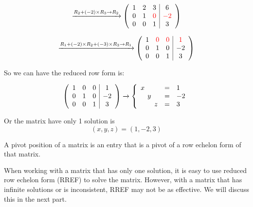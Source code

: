 \documentclass[a4paper,12pt]{article}
\begin{document}
\begin{frame}
        \[
        \xrightarrow{R_2 + (-2)\times R_3 \rightarrow R_2}
        \left( \begin{array}{ccc|c}
        1 & 2 & 3 & 6 \\
        0 & 1 & \textcolor{red}{0} & \textcolor{red}{-2} \\
        0 & 0 & 1 & 3 \\
        \end{array} \right)
        \]
        
\[
\xrightarrow{R_1 + (-2) \times R_2 + (-3) \times R_3 \rightarrow R_1}
\left( \begin{array}{ccc|c}
1 & \textcolor{red}{0} & \textcolor{red}{0} & \textcolor{red}{1} \\
0 & 1 & 0 & -2 \\
0 & 0 & 1 & 3 \\
\end{array} \right)
\]

        \newpage    
        \small
        So we can have the reduced row form is: 
        
        
        \[
        \centering
        \left( \begin{array}{ccc|c}
        1 & 0 & 0 & 1 \\
        0 & 1 & 0 & -2 \\
        0 & 0 & 1 & 3 \\
        \end{array} \right)
        \xrightarrow[]{}
        \left\{
        \begin{array}{lcl}
        x & = & 1\\
        \quad y & = & -2\\
        \quad \quad z & = & 3
        \end{array}
        \right.
        \]

        Or the matrix have only 1 solution is \[(x, y, z) = (1, -2, 3)\]
        \begin{tcolorbox}[title=Definition,colframe=blue!70!black, colback=blue!5!white]
        A pivot position of a matrix is an entry that is a pivot of a row echelon form of that matrix.
        \end{tcolorbox}
        
        When working with a matrix that has only one solution, it is easy to use reduced row echelon form (RREF) to solve the matrix. However, with a matrix that has infinite solutions or is inconsistent, RREF may not be as effective. We will discuss this in the next part.
    \end{frame}
\end{document}
